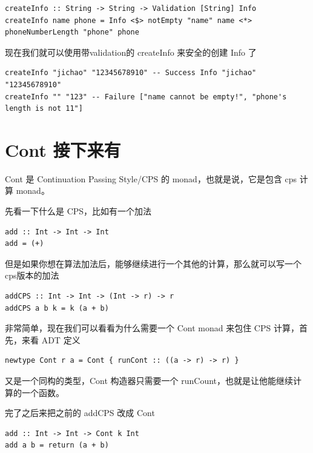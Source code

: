 \documentclass[letterspacing]{tufte-book}
\begin{document}
\lstset{language=haskell,label= ,caption= ,captionpos=b,numbers=none}
\begin{lstlisting}
createInfo :: String -> String -> Validation [String] Info
createInfo name phone = Info <$> notEmpty "name" name <*> phoneNumberLength "phone" phone
\end{lstlisting}

现在我们就可以使用带validation的 createInfo 来安全的创建 Info 了

\lstset{language=haskell,label= ,caption= ,captionpos=b,numbers=none}
\begin{lstlisting}
createInfo "jichao" "12345678910" -- Success Info "jichao" "12345678910"
createInfo "" "123" -- Failure ["name cannot be empty!", "phone's length is not 11"]
\end{lstlisting}

\chapter{Cont 接下来有}
\label{sec:orgba04a00}
Cont 是 Continuation Passing Style/CPS 的 monad，也就是说，它是包含 cps 计算 monad。

先看一下什么是 CPS，比如有一个加法
\lstset{language=haskell,label= ,caption= ,captionpos=b,numbers=none}
\begin{lstlisting}
add :: Int -> Int -> Int
add = (+)
\end{lstlisting}

但是如果你想在算法加法后，能够继续进行一个其他的计算，那么就可以写一个 cps版本的加法
\lstset{language=haskell,label= ,caption= ,captionpos=b,numbers=none}
\begin{lstlisting}
addCPS :: Int -> Int -> (Int -> r) -> r
addCPS a b k = k (a + b)
\end{lstlisting}

非常简单，现在我们可以看看为什么需要一个 Cont monad 来包住 CPS 计算，首先，来看 ADT 定义
\lstset{language=haskell,label= ,caption= ,captionpos=b,numbers=none}
\begin{lstlisting}
newtype Cont r a = Cont { runCont :: ((a -> r) -> r) }
\end{lstlisting}

又是一个同构的类型，Cont 构造器只需要一个 runCount，也就是让他能继续计算的一个函数。

完了之后来把之前的 addCPS 改成 Cont
\lstset{language=haskell,label= ,caption= ,captionpos=b,numbers=none}
\begin{lstlisting}
add :: Int -> Int -> Cont k Int
add a b = return (a + b)
\end{lstlisting}
\end{document}
